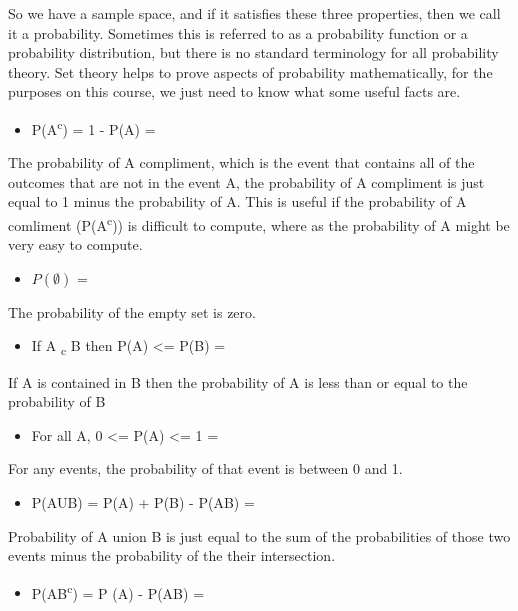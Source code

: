 \documentclass[]{book}
\providecommand{\tightlist}{%
  \setlength{\itemsep}{0pt}\setlength{\parskip}{0pt}}
\theoremstyle{definition}
\theoremstyle{definition}
\theoremstyle{definition}
\theoremstyle{remark}
\begin{document}
So we have a sample space, and if it satisfies these three properties,
then we call it a probability. Sometimes this is referred to as a
probability function or a probability distribution, but there is no
standard terminology for all probability theory. Set theory helps to
prove aspects of probability mathematically, for the purposes on this
course, we just need to know what some useful facts are.

\begin{itemize}
\tightlist
\item
  P(A\textsuperscript{c}) = 1 - P(A) =
\end{itemize}

The probability of A compliment, which is the event that contains all of
the outcomes that are not in the event A, the probability of A
compliment is just equal to 1 minus the probability of A. This is useful
if the probability of A comliment (P(A\textsuperscript{c})) is difficult
to compute, where as the probability of A might be very easy to compute.

\begin{itemize}
\tightlist
\item
  \(P (\emptyset)\) =
\end{itemize}

The probability of the empty set is zero.

\begin{itemize}
\tightlist
\item
  If A \textsubscript{c} B then P(A) \textless{}= P(B) =
\end{itemize}

If A is contained in B then the probability of A is less than or equal
to the probability of B

\begin{itemize}
\tightlist
\item
  For all A, 0 \textless{}= P(A) \textless{}= 1 =
\end{itemize}

For any events, the probability of that event is between 0 and 1.

\begin{itemize}
\tightlist
\item
  P(AUB) = P(A) + P(B) - P(AB) =
\end{itemize}

Probability of A union B is just equal to the sum of the probabilities
of those two events minus the probability of the their intersection.

\begin{itemize}
\tightlist
\item
  P(AB\textsuperscript{c}) = P (A) - P(AB) =
\end{itemize}
\end{document}
